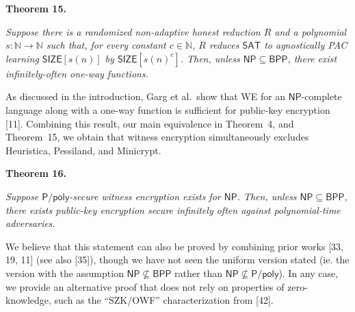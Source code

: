 \documentclass[10pt,a4paper]{article}
\begin{document}


\par\medskip\noindent\textbf{
\textbf{Theorem 15}\textbf{.}
}\par



\emph{Suppose there is a randomized non-adaptive honest reduction $R$ and a polynomial $s:\mathbb{N}\to\mathbb{N}$ such that, for every constant $c\in\mathbb{N}$, $R$ reduces ${\mathsf{SAT}}$ to agnostically PAC learning ${\mathsf{SIZE}}[s(n)]$ by ${\mathsf{SIZE}}[s(n)^{c}]$. Then, unless ${\mathsf{NP}}\subseteq{\mathsf{BPP}}$, there exist infinitely-often one-way functions.}\par






As discussed in the introduction, Garg et al. show that WE for an ${\mathsf{NP}}$-complete language along with a one-way function is sufficient for public-key encryption [11]. Combining this result, our main equivalence in Theorem 4, and Theorem 15, we obtain that witness encryption simultaneously excludes Heuristica, Pessiland, and Minicrypt.\par





\par\medskip\noindent\textbf{
\textbf{Theorem 16}\textbf{.}
}\par



\emph{Suppose ${\mathsf{P}}/{\mathsf{poly}}$-secure witness encryption exists for ${\mathsf{NP}}$. Then, unless ${\mathsf{NP}}\subseteq{\mathsf{BPP}}$, there exists public-key encryption secure infinitely often against polynomial-time adversaries.}\par






We believe that this statement can also be proved by combining prior works [33, 19, 11] (see also [35]), though we have not seen the uniform version stated (ie. the version with the assumption ${\mathsf{NP}}\nsubseteq{\mathsf{BPP}}$ rather than ${\mathsf{NP}}\nsubseteq{\mathsf{P}}/{\mathsf{poly}}$). In any case, we provide an alternative proof that does not rely on properties of zero-knowledge, such as the “SZK/OWF” characterization from [42].\par
\end{document}
